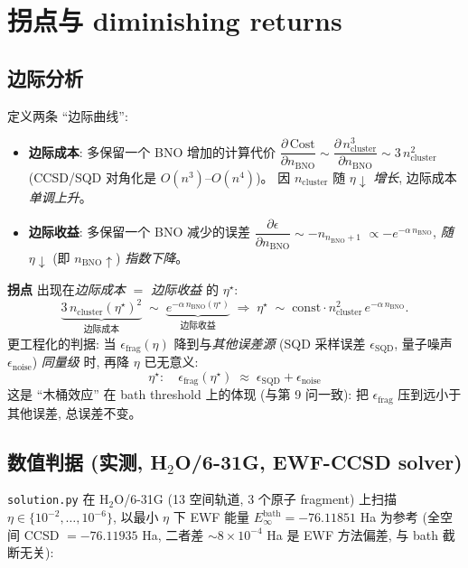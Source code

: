 \documentclass[11pt]{article}
\begin{document}
\section{拐点与 diminishing returns}
\subsection*{边际分析}
定义两条 ``边际曲线'':
\begin{itemize}
  \item \textbf{边际成本}: 多保留一个 BNO 增加的计算代价
        $\dfrac{\partial\,\text{Cost}}{\partial n_{\text{BNO}}}
        \sim \dfrac{\partial\,n_{\text{cluster}}^3}{\partial n_{\text{BNO}}}
        \sim 3\,n_{\text{cluster}}^2$ (CCSD/SQD 对角化是 $O(n^3)$--$O(n^4)$)。
        因 $n_{\text{cluster}}$ 随 $\eta\!\downarrow$ \emph{增长}, 边际成本\emph{单调上升}。
  \item \textbf{边际收益}: 多保留一个 BNO 减少的误差
        $\dfrac{\partial\epsilon}{\partial n_{\text{BNO}}}\sim -n_{n_{\text{BNO}}+1}$
        $\propto -e^{-\alpha\,n_{\text{BNO}}}$, \emph{随} $\eta\!\downarrow$
        (即 $n_{\text{BNO}}\!\uparrow$) \emph{指数下降}。
\end{itemize}
\textbf{拐点} 出现在\emph{边际成本 $=$ 边际收益} 的 $\eta^\star$:
\[
  \underbrace{3\,n_{\text{cluster}}(\eta^\star)^2}_{\text{边际成本}}
  \;\sim\;
  \underbrace{e^{-\alpha\,n_{\text{BNO}}(\eta^\star)}}_{\text{边际收益}}
  \;\Longrightarrow\;
  \eta^\star \;\sim\; \text{const}\cdot n_{\text{cluster}}^2\,e^{-\alpha\,n_{\text{BNO}}}.
\]
更工程化的判据: 当 $\epsilon_{\text{frag}}(\eta)$ 降到与\emph{其他误差源}
(SQD 采样误差 $\epsilon_{\text{SQD}}$, 量子噪声 $\epsilon_{\text{noise}}$) \emph{同量级}
时, 再降 $\eta$ 已无意义:
\[
  \boxed{\;\eta^\star:\quad \epsilon_{\text{frag}}(\eta^\star)\;\approx\;\epsilon_{\text{SQD}}+\epsilon_{\text{noise}}\;}
  \tag{$\eta^\star$}
\]
这是 ``木桶效应'' 在 bath threshold 上的体现 (与第 9 问一致): 把
$\epsilon_{\text{frag}}$ 压到远小于其他误差, 总误差不变。

\subsection*{数值判据 (实测, H$_2$O/6-31G, EWF-CCSD solver)}
\sloppy
\texttt{solution.py} 在 H$_2$O/6-31G (13 空间轨道, 3 个原子 fragment) 上扫描
$\eta\in\{10^{-2},\ldots,10^{-6}\}$, 以最小 $\eta$ 下 EWF 能量
$E_{\infty}^{\text{bath}}=-76.11851$ Ha 为参考 (全空间 CCSD $=-76.11935$ Ha,
二者差 $\sim 8\times10^{-4}$ Ha 是 EWF 方法偏差, 与 bath 截断无关):
\end{document}
